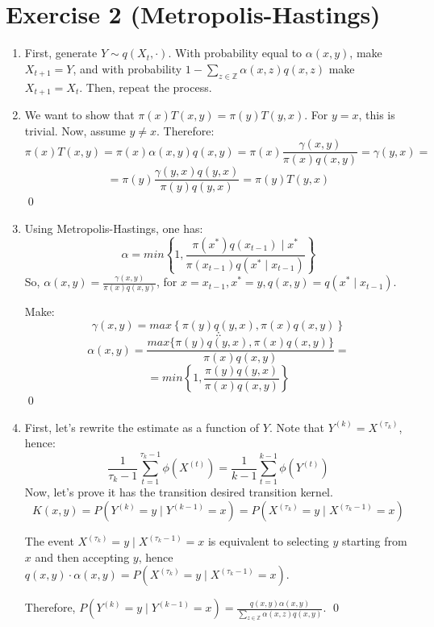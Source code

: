 \documentclass[12pt,letterpaper]{article}
\begin{document}
\section*{Exercise 2 (Metropolis-Hastings)}
\begin{enumerate}[leftmargin=!,labelindent=5pt]
\item First, generate $Y \sim q(X_t, \cdot)$. 
With probability equal to $\alpha(x,y)$, make $X_{t+1} = Y$, and with
probability $1 - \sum_{z \in \mathbb Z} \alpha(x,z)q(x,z)$ make
$X_{t+1} = X_t$. Then, repeat the process.

\item We want to show that $\pi(x)T(x,y) = \pi(y)T(y,x)$.
For $y=x$, this is trivial. Now, assume $y\neq x$. Therefore:
$$
\pi(x)T(x,y) = \pi(x)\alpha(x,y)q(x,y) =
\pi(x)\frac{\gamma(x,y)}{\pi(x)q(x,y)} = \gamma(y,x) =
$$
$$
= 
\pi(y)\frac{\gamma(y,x)q(y,x)}{\pi(y)q(y,x)} = \pi(y)T(y,x)
$$
\qed


\item Using Metropolis-Hastings, one has:
$$ \alpha = min \left\{ 
1, \frac{\pi(x^*)q(x_{t-1}) \mid x^*}{\pi(x_{t-1})q(x^*\mid x_{t-1})}
\right\}$$
So, $\alpha(x,y) = \frac{\gamma(x,y)}{\pi(x)q(x,y)}$, for
$x = x_{t-1}, x^* = y, q(x,y) = q(x^* \mid x_{t-1})$.

Make:
$$ \gamma(x,y) = max \left\{ 
\pi(y)q(y,x),\pi(x)q(x,y)
\right\}$$
$$ \therefore $$
$$\alpha(x,y) =
\frac{max\{ \pi(y)q(y,x), \pi(x)q(x,y)\}}{\pi(x)q(x,y)} = 
$$
$$ = min \left\{ 
1, \frac{\pi(y)q(y,x)}{\pi(x)q(x,y)}
\right\}$$
\qed

\item First, let's rewrite the estimate as a function of $Y$.
Note that $Y^{(k)} = X^{(\tau_k)}$, hence:
$$
\frac{1}{\tau_k - 1} \sum_{t=1}^{\tau_k-1} \phi(X^{(t)}) =
\frac{1}{k - 1} \sum_{t=1}^{k-1} \phi(Y^{(t)})
$$
Now, let's prove it has the transition desired transition kernel.
$$
K(x,y) = P(Y^{(k)}= y \mid Y^{(k-1)}=x) =
P(X^{(\tau_k)}=y \mid X^{(\tau_k -1)}=x)
$$

The event $X^{(\tau_k)}=y \mid X^{(\tau_k -1)}=x$ is equivalent
to selecting $y$ starting from $x$ and then accepting $y$, hence
$q(x,y)\cdot \alpha(x,y) = P(X^{(\tau_k)}=y \mid X^{(\tau_k -1)}=x)$.

Therefore, $P(Y^{(k)}= y \mid Y^{(k-1)}=x) =
\frac{q(x,y)\alpha(x,y)}{\sum_{z \in \mathbb Z}\alpha(x,z)q(x,y)} $.
\qed


\end{enumerate}
\end{document}
